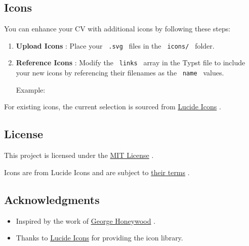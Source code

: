 \subsection{Icons}\label{icons}

You can enhance your CV with additional icons by following these steps:

\begin{enumerate}
\item
  \textbf{Upload Icons} : Place your \texttt{\ .svg\ } files in the
  \texttt{\ icons/\ } folder.
\item
  \textbf{Reference Icons} : Modify the \texttt{\ links\ } array in the
  Typst file to include your new icons by referencing their filenames as
  the \texttt{\ name\ } values.

  Example:

\begin{Shaded}
\begin{Highlighting}[]
\NormalTok{links: [}
\NormalTok{]}
\end{Highlighting}
\end{Shaded}
\end{enumerate}

For existing icons, the current selection is sourced from
\href{https://lucide.dev/icons/}{Lucide Icons} .

\subsection{License}\label{license}

This project is licensed under the
\href{https://github.com/typst/packages/raw/main/packages/preview/vantage-cv/1.0.0/LICENSE}{MIT
License} .

Icons are from Lucide Icons and are subject to
\href{https://lucide.dev/license}{their terms} .

\subsection{Acknowledgments}\label{acknowledgments}

\begin{itemize}
\tightlist
\item
  Inspired by the work of
  \href{https://github.com/GeorgeHoneywood/alta-typst}{George Honeywood}
  .
\item
  Thanks to \href{https://lucide.dev/icons/}{Lucide Icons} for providing
  the icon library.
\end{itemize}


